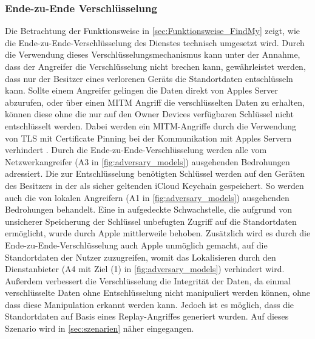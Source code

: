 \subsubsection{Ende-zu-Ende Verschlüsselung}
Die Betrachtung der Funktionsweise in \autoref{sec:Funktionsweise_FindMy} zeigt, wie die Ende-zu-Ende-Verschlüsselung des Dienstes technisch umgesetzt wird.
Durch die Verwendung dieses Verschlüsselungsmechanismus kann unter der Annahme, dass der Angreifer die Verschlüsselung nicht brechen kann, gewährleistet werden, dass nur der Besitzer eines verlorenen Geräts die Standortdaten entschlüsseln kann.
Sollte einem Angreifer gelingen die Daten direkt von Apples Server abzurufen, oder über einen \ac{MITM} Angriff die verschlüsselten Daten zu erhalten, können diese ohne die nur auf den Owner Devices verfügbaren Schlüssel nicht entschlüsselt werden.
Dabei werden ein \ac{MITM}-Angriffe durch die Verwendung von \ac{TLS} mit Certificate Pinning bei der Kommunikation mit Apples Servern verhindert \cite{Heinrich_FindMy}.
Durch die Ende-zu-Ende-Verschlüsselung werden alle vom Netzwerkangreifer (A3 in \autoref{fig:adversary_models}) ausgehenden Bedrohungen adressiert.
Die zur Entschlüsselung benötigten Schlüssel werden auf den Geräten des Besitzers in der als sicher geltenden iCloud Keychain gespeichert.
So werden auch die von lokalen Angreifern (A1 in \autoref{fig:adversary_models}) ausgehenden Bedrohungen behandelt.
Eine in \cite{Heinrich_FindMy} aufgedeckte Schwachstelle, die aufgrund von unsicherer Speicherung der Schlüssel unbefugten Zugriff auf die Standortdaten ermöglicht, wurde durch Apple mittlerweile behoben.
Zusätzlich wird es durch die Ende-zu-Ende-Verschlüsselung auch Apple unmöglich gemacht, auf die Standortdaten der Nutzer zuzugreifen, womit das Lokalisieren durch den Dienstanbieter (A4 mit Ziel (1) in \autoref{fig:adversary_models}) verhindert wird.
Außerdem verbessert die Verschlüsselung die Integrität der Daten, da einmal verschlüsselte Daten ohne Entschlüsselung nicht manipuliert werden können, ohne dass diese Manipulation erkannt werden kann.
Jedoch ist es möglich, dass die Standortdaten auf Basis eines Replay-Angriffes generiert wurden.
Auf dieses Szenario wird in \autoref{sec:szenarien} näher eingegangen.


